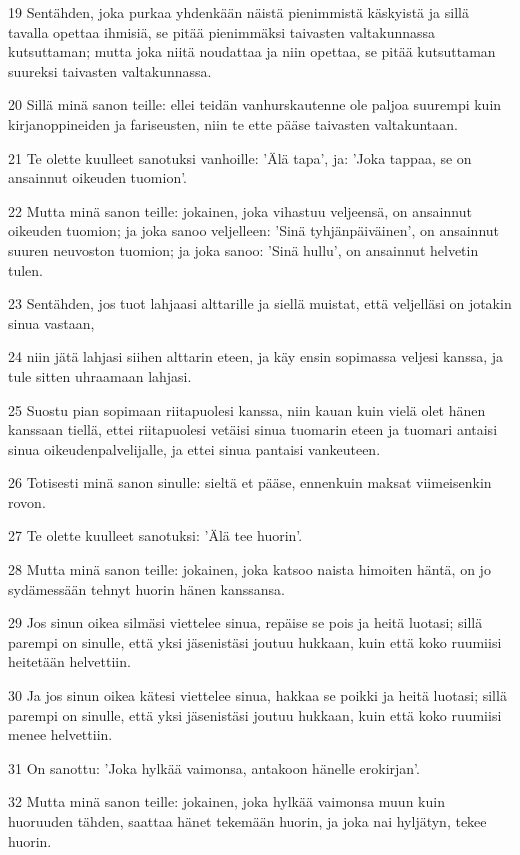 \par 19 Sentähden, joka purkaa yhdenkään näistä pienimmistä käskyistä ja sillä tavalla opettaa ihmisiä, se pitää pienimmäksi taivasten valtakunnassa kutsuttaman; mutta joka niitä noudattaa ja niin opettaa, se pitää kutsuttaman suureksi taivasten valtakunnassa.
\par 20 Sillä minä sanon teille: ellei teidän vanhurskautenne ole paljoa suurempi kuin kirjanoppineiden ja fariseusten, niin te ette pääse taivasten valtakuntaan.
\par 21 Te olette kuulleet sanotuksi vanhoille: 'Älä tapa', ja: 'Joka tappaa, se on ansainnut oikeuden tuomion'.
\par 22 Mutta minä sanon teille: jokainen, joka vihastuu veljeensä, on ansainnut oikeuden tuomion; ja joka sanoo veljelleen: 'Sinä tyhjänpäiväinen', on ansainnut suuren neuvoston tuomion; ja joka sanoo: 'Sinä hullu', on ansainnut helvetin tulen.
\par 23 Sentähden, jos tuot lahjaasi alttarille ja siellä muistat, että veljelläsi on jotakin sinua vastaan,
\par 24 niin jätä lahjasi siihen alttarin eteen, ja käy ensin sopimassa veljesi kanssa, ja tule sitten uhraamaan lahjasi.
\par 25 Suostu pian sopimaan riitapuolesi kanssa, niin kauan kuin vielä olet hänen kanssaan tiellä, ettei riitapuolesi vetäisi sinua tuomarin eteen ja tuomari antaisi sinua oikeudenpalvelijalle, ja ettei sinua pantaisi vankeuteen.
\par 26 Totisesti minä sanon sinulle: sieltä et pääse, ennenkuin maksat viimeisenkin rovon.
\par 27 Te olette kuulleet sanotuksi: 'Älä tee huorin'.
\par 28 Mutta minä sanon teille: jokainen, joka katsoo naista himoiten häntä, on jo sydämessään tehnyt huorin hänen kanssansa.
\par 29 Jos sinun oikea silmäsi viettelee sinua, repäise se pois ja heitä luotasi; sillä parempi on sinulle, että yksi jäsenistäsi joutuu hukkaan, kuin että koko ruumiisi heitetään helvettiin.
\par 30 Ja jos sinun oikea kätesi viettelee sinua, hakkaa se poikki ja heitä luotasi; sillä parempi on sinulle, että yksi jäsenistäsi joutuu hukkaan, kuin että koko ruumiisi menee helvettiin.
\par 31 On sanottu: 'Joka hylkää vaimonsa, antakoon hänelle erokirjan'.
\par 32 Mutta minä sanon teille: jokainen, joka hylkää vaimonsa muun kuin huoruuden tähden, saattaa hänet tekemään huorin, ja joka nai hyljätyn, tekee huorin.
